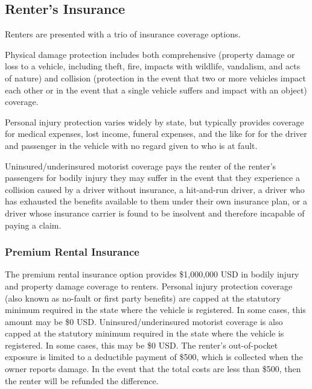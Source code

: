 \documentclass[review,12pt]{elsarticle}
\begin{document}
\subsection{Renter's Insurance}
Renters are presented with a trio of insurance coverage options.

Physical damage protection includes both comprehensive (property damage or loss to a vehicle, including theft, fire, impacts with wildlife,  vandalism, and acts of nature) and collision (protection in the event that two or more vehicles impact each other or in the event that a single vehicle suffers and impact with an object) coverage.

Personal injury protection varies widely by state, but typically provides coverage for medical expenses, lost income, funeral expenses, and the like for for the driver and passenger in the vehicle with no regard given to who is at fault.

Uninsured/underinsured motorist coverage pays the renter of the renter's passengers for bodily injury they may suffer in the event that they experience a collision caused by a driver without insurance, a hit-and-run driver, a driver who has exhausted the benefits available to them under their own insurance plan, or a driver whose insurance carrier is found to be insolvent and therefore incapable of paying a claim.

\subsubsection{Premium Rental Insurance}\label{premium-rental-insurance}
The premium rental insurance option provides \$1,000,000 USD in bodily injury and property damage coverage to renters. Personal injury protection coverage (also known as no-fault or first party benefits) are capped at the statutory minimum required in the state where the vehicle is registered. In some cases, this amount may be \$0 USD. Uninsured/underinsured motorist coverage is also capped at the statutory minimum required in the state where the vehicle is registered. In some cases, this may be \$0 USD. The renter's out-of-pocket exposure is limited to a deductible payment of \$500, which is collected when the owner reports damage. In the event that the total costs are less than \$500, then the renter will be refunded the difference.
\end{document}
